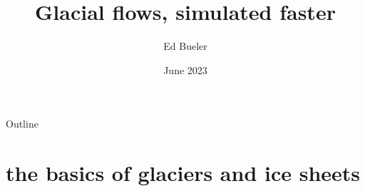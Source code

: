 \documentclass[svgnames,
               hyperref={colorlinks,citecolor=DeepPink4,linkcolor=FireBrick,urlcolor=Maroon},
               usepdftitle=false]  %
               {beamer}
\title{Glacial flows, simulated faster}
\author{Ed Bueler}
\institute[UAF]{University of Alaska Fairbanks}
\date[]{June 2023}
\begin{document}
\beamertemplatenavigationsymbolsempty


{
  \begin{frame}
    \titlepage
  \end{frame}
}

\begin{frame}{Outline}
  \tableofcontents[hideallsubsections]
\end{frame}


\section{the basics of glaciers and ice sheets}
\end{document}
